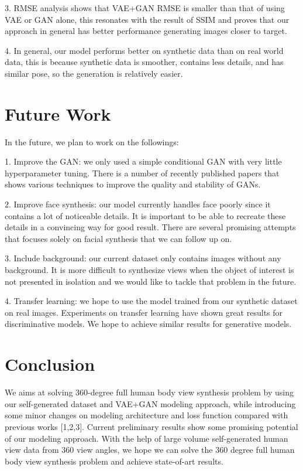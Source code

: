 \documentclass[10pt,conference]{IEEEtran}
\begin{document}
3. RMSE analysis shows that VAE+GAN RMSE is smaller than that of using VAE or GAN alone, this resonates with the result of SSIM and proves that our approach in general has better performance generating images closer to target. 

4. In general, our model performs better on synthetic data than on real world data, this is because synthetic data is smoother, contains less details, and has similar pose, so the generation is relatively easier. 

\section{Future Work}

In the future, we plan to work on the followings:

1. Improve the GAN: we only used a simple conditional GAN with very little hyperparameter tuning. There is a number of recently published papers that shows various techniques to improve the quality and stability of GANs.

2. Improve face synthesis: our model currently handles face poorly since it contains a lot of noticeable details. It is important to be able to recreate these details in a convincing way for good result. There are several promising attempts \autocite{yim2015rotating, huang2017beyond} that focuses solely on facial synthesis that we can follow up on.

3. Include background: our current dataset only contains images without any background. It is more difficult to synthesize views when the object of interest is not presented in isolation and we would like to tackle that problem in the future.

4. Transfer learning: we hope to use the model trained from our synthetic dataset on real images. Experiments on transfer learning \autocite{shrivastava2016learning} have shown great results for discriminative models. We hope to achieve similar results for generative models.

\section{Conclusion}
We aims at solving 360-degree full human body view synthesis problem by using our self-generated dataset and VAE+GAN modeling approach, while introducing some minor changes on modeling architecture and loss function compared with previous works [1,2,3].
Current preliminary results show some promising potential of our modeling approach. With the help of large volume self-generated human view data from 360 view angles, we hope we can solve the 360 degree full human body view synthesis problem and achieve state-of-art results.
\end{document}
